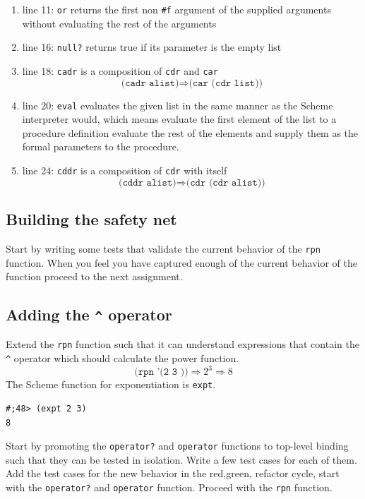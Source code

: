 \documentclass[12pt,a4paper,english,twoside]{article}
\begin{document}
\begin{enumerate}
\item line 11: \texttt{or} returns the first non \texttt{\#f} argument of the 
  supplied arguments without evaluating the rest of the arguments
  \item line 16: \texttt{null?} returns true if its parameter is the empty list
  \item line 18: \texttt{cadr} is a composition of \texttt{cdr} and \texttt{car} 
    \begin{equation*}
      \texttt{(cadr alist)} \Rightarrow \texttt{(car (cdr list))}
    \end{equation*}
  \item line 20: \texttt{eval} evaluates the given list in the same manner as the 
    Scheme interpreter would, which means evaluate the first element of the 
    list to a procedure definition evaluate the rest of the elements and 
    supply them as the formal parameters to the procedure.
  \item line 24: \texttt{cddr} is a composition of \texttt{cdr} with itself
    \begin{equation*}
      \texttt{(cddr alist)} \Rightarrow \texttt{(cdr (cdr alist))}
    \end{equation*}
\end{enumerate}
\subsection{Building the safety net}
Start by writing some tests that validate the current behavior of the 
\texttt{rpn} function. When you feel you have captured enough of the current 
behavior of the function proceed to the next assignment.
\subsection{Adding the \texttt{\^{}} operator}
Extend the \texttt{rpn} function such that it can understand expressions that 
contain the \texttt{\^{}} operator which should calculate the power function.  
\begin{equation*}
\texttt{(rpn '(2 3 \^{}))} \Rightarrow 2^{3} \Rightarrow 8 
\end{equation*}
The Scheme function for exponentiation is \texttt{expt}.
\begin{lstlisting}
#;48> (expt 2 3)
8
\end{lstlisting}
Start by promoting the \texttt{operator?} and \texttt{operator} functions to 
top-level binding such that they can be tested in isolation. Write a few test 
cases for each of them. Add the test cases for the new behavior in the 
red,green, refactor cycle, start with the \texttt{operator?} and 
\texttt{operator} function. Proceed with the \texttt{rpn} function.
\end{document}
